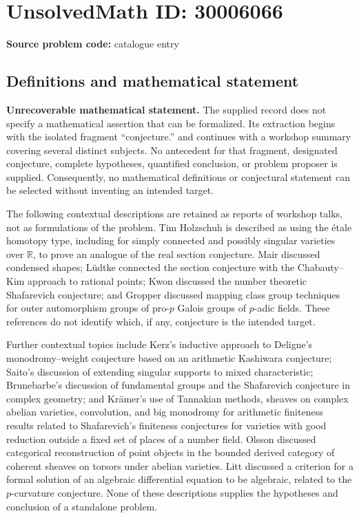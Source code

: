 \documentclass[11pt]{article}
\newcommand{\R}{\mathbb{R}}
\begin{document}
\section*{UnsolvedMath ID: 30006066}
\textbf{Source problem code:} catalogue entry
\subsection{Definitions and mathematical statement}
\textbf{Unrecoverable mathematical statement.} The supplied record does not specify a mathematical assertion that can be formalized. Its extraction begins with the isolated fragment ``conjecture.'' and continues with a workshop summary covering several distinct subjects. No antecedent for that fragment, designated conjecture, complete hypotheses, quantified conclusion, or problem proposer is supplied. Consequently, no mathematical definitions or conjectural statement can be selected without inventing an intended target.

The following contextual descriptions are retained as reports of workshop talks, not as formulations of the problem. Tim Holzschuh is described as using the étale homotopy type, including for simply connected and possibly singular varieties over \(\R\), to prove an analogue of the real section conjecture. Mair discussed condensed shapes; Lüdtke connected the section conjecture with the Chabauty--Kim approach to rational points; Kwon discussed the number theoretic Shafarevich conjecture; and Gropper discussed mapping class group techniques for outer automorphism groups of pro-\(p\) Galois groups of \(p\)-adic fields. These references do not identify which, if any, conjecture is the intended target.

Further contextual topics include Kerz's inductive approach to Deligne's monodromy--weight conjecture based on an arithmetic Kashiwara conjecture; Saito's discussion of extending singular supports to mixed characteristic; Brunebarbe's discussion of fundamental groups and the Shafarevich conjecture in complex geometry; and Krämer's use of Tannakian methods, sheaves on complex abelian varieties, convolution, and big monodromy for arithmetic finiteness results related to Shafarevich's finiteness conjectures for varieties with good reduction outside a fixed set of places of a number field. Olsson discussed categorical reconstruction of point objects in the bounded derived category of coherent sheaves on torsors under abelian varieties. Litt discussed a criterion for a formal solution of an algebraic differential equation to be algebraic, related to the \(p\)-curvature conjecture. None of these descriptions supplies the hypotheses and conclusion of a standalone problem.
\end{document}
